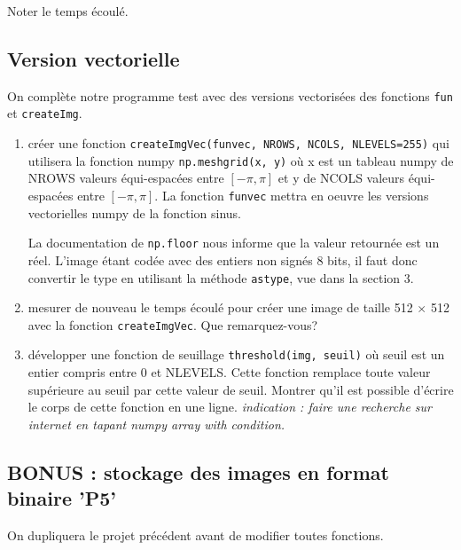 \documentclass[a4paper, 10pt]{article}
\begin{document}
Noter le temps écoulé.
\subsection{Version vectorielle}

On complète notre programme test avec des versions vectorisées des
fonctions {\tt fun} et {\tt createImg}.

\begin{enumerate} 

\item créer une fonction {\tt createImgVec(funvec, NROWS, NCOLS, NLEVELS=255)}
qui utilisera la fonction numpy {\tt np.meshgrid(x, y)} où
x est un tableau numpy de NROWS valeurs équi-espacées entre $[-\pi,\pi]$
et y de NCOLS valeurs équi-espacées entre $[-\pi,\pi]$.
La fonction {\tt funvec} mettra en oeuvre les versions vectorielles numpy de
la fonction sinus. 

La documentation de {\tt np.floor} nous informe que la valeur retournée est un réel.
L'image étant codée avec des entiers non signés 8 bits,
il faut donc convertir le type en utilisant la méthode {\tt astype}, vue dans la
section 3.

\item mesurer de nouveau le temps écoulé pour créer une image de taille 512 $\times$ 512
avec la fonction {\tt createImgVec}. Que remarquez-vous?

\item développer une fonction de seuillage {\tt threshold(img, seuil)} où seuil
est un entier compris entre 0 et NLEVELS. Cette fonction remplace toute valeur
supérieure au seuil par cette valeur de seuil. 
Montrer qu'il est possible d'écrire le corps de cette fonction en une ligne.
{\it indication : faire une recherche sur internet en tapant numpy array with condition.}

\end{enumerate}

\subsection{BONUS : stockage des images en format binaire 'P5'}

On dupliquera le projet précédent avant de modifier toutes fonctions.
\end{document}
